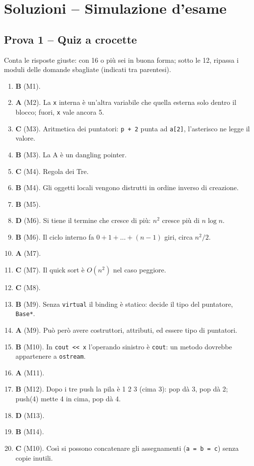 \chapter{Soluzioni -- Simulazione d'esame}

\section*{Prova 1 -- Quiz a crocette}

Conta le risposte giuste: con 16 o più sei in buona forma; sotto le 12, ripassa i moduli
delle domande sbagliate (indicati tra parentesi).

\begin{soluzione}
\begin{enumerate}[label=\textbf{\arabic*.}]
  \item \textbf{B} (M1).
  \item \textbf{A} (M2). La \texttt{x} interna è un'altra variabile che  quella
        esterna solo dentro il blocco; fuori, \texttt{x} vale ancora 5.
  \item \textbf{C} (M3). Aritmetica dei puntatori: \texttt{p + 2} punta ad \texttt{a[2]},
        l'asterisco ne legge il valore.
  \item \textbf{B} (M3). La A è un dangling pointer.
  \item \textbf{C} (M4). Regola dei Tre.
  \item \textbf{B} (M4). Gli oggetti locali vengono distrutti in ordine inverso di creazione.
  \item \textbf{B} (M5).
  \item \textbf{D} (M6). Si tiene il termine che cresce di più: $n^2$ cresce più di
        $n \log n$.
  \item \textbf{B} (M6). Il ciclo interno fa $0 + 1 + \ldots + (n-1)$ giri, circa
        $n^2/2$.
  \item \textbf{A} (M7).
  \item \textbf{C} (M7). Il quick sort è $O(n^2)$ nel caso peggiore.
  \item \textbf{C} (M8).
  \item \textbf{B} (M9). Senza \texttt{virtual} il binding è statico: decide il tipo del
        puntatore, \texttt{Base*}.
  \item \textbf{A} (M9). Può però avere costruttori, attributi, ed essere tipo di puntatori.
  \item \textbf{B} (M10). In \texttt{cout << x} l'operando sinistro è \texttt{cout}: un
        metodo dovrebbe appartenere a \texttt{ostream}.
  \item \textbf{A} (M11).
  \item \textbf{B} (M12). Dopo i tre push la pila è 1 2 3 (cima 3): pop dà 3, pop dà 2;
        push(4) mette 4 in cima, pop dà 4.
  \item \textbf{D} (M13).
  \item \textbf{B} (M14).
  \item \textbf{C} (M10). Così si possono concatenare gli assegnamenti
        (\texttt{a = b = c}) senza copie inutili.
\end{enumerate}
\end{soluzione}

